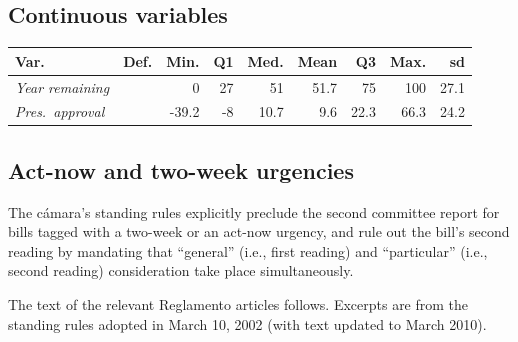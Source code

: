 \documentclass[letter,12pt]{article}
\begin{document}
\subsection{Continuous variables}

\begin{footnotesize}

  \begin{tabular}{llrrrrrrr}
               Var.  & Def. &  Min.&  Q1 & Med. & Mean &  Q3  &  Max. &   sd \\ \hline
\emph{Year remaining}&      &  0   &  27 & 51   & 51.7 & 75   & 100   &   27.1 \\
\emph{Pres.~approval}&      &-39.2 & -8 &  10.7 &  9.6 & 22.3 &  66.3 &   24.2 \\
\end{tabular}

\end{footnotesize}
  
\subsection{Act-now and two-week urgencies}

The cámara's standing rules explicitly preclude the second committee report for bills tagged with a two-week or an act-now urgency, and rule out the bill's second reading by mandating that ``general'' (i.e., first reading) and ``particular'' (i.e., second reading) consideration take place simultaneously. 

The text of the relevant Reglamento articles follows. Excerpts are from the standing rules adopted in March 10, 2002 (with text updated to March 2010).  
\end{document}
